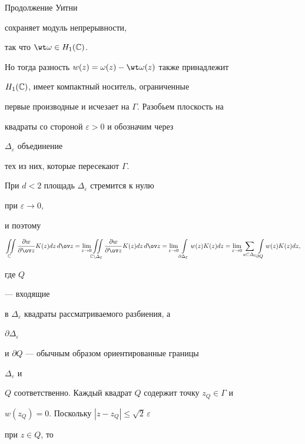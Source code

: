 \begin{pf} 


Продолжение Уитни 


сохраняет модуль непрерывности, 


так что $\wt\omega\in H_1(\Bbb C)$. 


Но тогда разность $w(z)=\omega(z)-\wt\omega(z)$ также принадлежит 


$H_1(\Bbb C)$, имеет компактный носитель, ограниченные 


первые производные и исчезает на $\Gamma$. Разобьем плоскость на 


квадраты со стороной $\varepsilon>0$ и обозначим через 


$\Delta_\varepsilon$ объединение 


тех из них, которые пересекают $\Gamma$. 


При $d<2$ площадь $\Delta_\varepsilon$ стремится к нулю 


при $\varepsilon\to 0$, 


и поэтому 


$$


\iint\limits_{\Bbb C}\myfrac{w}{\ov z}K(z)dz\,d\ov z= 


\lim_{\varepsilon\to 0} 


\iint\limits_{\Bbb C\setminus\Delta_{\scriptstyle\varepsilon}} 


\myfrac{w}{\ov z}K(z)dz\,d\ov z= 


\lim_{\varepsilon\to 0}\int\limits_{\partial\Delta_{\scriptstyle\varepsilon}}


w(z)K(z)dz=\lim_{\varepsilon\to 0}


\sum_{a\subset\Delta_{\scriptstyle\varepsilon}}


\intl_{\partial Q}w(z)K(z)dz, 


$$


где $Q$ 


--- входящие 


в $\Delta_\varepsilon$ квадраты рассматриваемого разбиения, а 


$\partial\Delta_\varepsilon$ 


и $\partial Q$ --- обычным образом ориентированные границы 


$\Delta_\varepsilon$ и 


$Q$ соответственно. Каждый квадрат $Q$ содержит точку $z_Q\in\Gamma$ и 


$w(z_Q)=0$. Поскольку $|z-z_Q|\le \sqrt{2}\,\varepsilon$ 


при $z\in Q$, то 



\end{pf}
